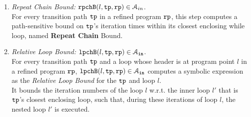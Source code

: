 \begin{enumerate}
  \item \emph{Repeat Chain Bound:} $\mathtt{rpchB}(l, \mathtt{tp}, \mathtt{rp}) \in \mathcal{A}_{in}$.
  \\
  For every transition path $\mathtt{tp}$ in a refined program $\mathtt{rp}$,
  this step computes a path-sensitive
  bound on $\mathtt{tp}$'s iteration times within its closest enclosing while loop, named \textbf{Repeat Chain} Bound.
  \item \emph{Relative Loop Bound:} $\mathtt{lpchB}(l, \mathtt{tp}, \mathtt{rp}) \in \mathcal{A}_{\mathtt{in}}$.
  \\
%
For every transition path $\mathtt{tp}$
and a loop whose header is at program point $l$ in a refined program $\mathtt{rp}$,
 $\mathtt{lpchB}(l, \mathtt{tp}, \mathtt{rp}) \in \mathcal{A}_{\mathtt{in}}$ computes a symbolic expression
as the \emph{Relative Loop Bound} for the $\mathtt{tp}$ and loop $l$.
\\
It bounds the iteration numbers of the loop $l$ w.r.t.
the inner loop $l'$ that is $\mathtt{tp}$'s closest enclosing loop,
such that,
during these iterations of loop $l$, the nested loop $l'$ is executed.
\end{enumerate}
